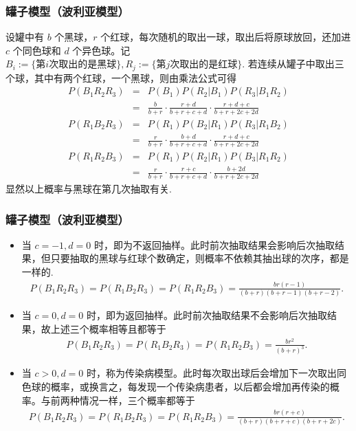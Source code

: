 \begin{frame}
	\frametitle{罐子模型（波利亚模型）}
	\begin{exam}
		设罐中有 $b$ 个黑球，$r$ 个红球，每次随机的取出一球，取出后将原球放回，还加进 $c$ 个同色球和 $d$ 个异色球。记 $B_i:=\{\mbox{第} i\mbox{次取出的是黑球}\}, R_j:=\{\mbox{第} j\mbox{次取出的是红球}\}$. 若连续从罐子中取出三个球，其中有两个红球，一个黑球，则由乘法公式可得
		\begin{eqnarray*}
			P(B_1R_2R_3)&=&P(B_1)P(R_2|B_1)P(R_3|B_1R_2)\\
			&=&\frac{b}{b+r}\cdot\frac{r+d}{b+r+c+d}\cdot\frac{r+d+c}{b+r+2c+2d}\\
			P(R_1B_2R_3)&=&P(R_1)P(B_2|R_1)P(R_3|R_1B_2)\\
			&=&\frac{r}{b+r}\cdot\frac{b+d}{b+r+c+d}\cdot\frac{r+d+c}{b+r+2c+2d}\\
			P(R_1R_2B_3)&=&P(R_1)P(R_2|R_1)P(B_3|R_1R_2)\\
			&=&\frac{r}{b+r}\cdot\frac{r+c}{b+r+c+d}\cdot\frac{b+2d}{b+r+2c+2d}
		\end{eqnarray*}
		显然以上概率与黑球在第几次抽取有关.
	\end{exam}
\end{frame}
\begin{frame}
	\frametitle{罐子模型（波利亚模型）}
	\vspace{-0.3cm}
	\begin{itemize}[<+-|alert@+>]
		\item 当 $c=-1, d=0$ 时，即为不返回抽样。此时前次抽取结果会影响后次抽取结果，但只要抽取的黑球与红球个数确定，则概率不依赖其抽出球的次序，都是一样的.
		{\small\begin{eqnarray*}
				P(B_1R_2R_3)= P(R_1B_2R_3)=P(R_1R_2B_3)=\frac{br(r-1)}{(b+r)(b+r-1)(b+r-2)}.
		\end{eqnarray*}}
		\item 当 $c=0,d=0$ 时，即为返回抽样。此时前次抽取结果不会影响后次抽取结果，故上述三个概率相等且都等于
		{\small\begin{eqnarray*}
				P(B_1R_2R_3)= P(R_1B_2R_3)=P(R_1R_2B_3)=\frac{br^2}{(b+r)^3}.
		\end{eqnarray*}}
		\item 当 $c>0,d=0$ 时，称为传染病模型。此时每次取出球后会增加下一次取出同色球的概率，或换言之，每发现一个传染病患者，以后都会增加再传染的概率。与前两种情况一样，三个概率都等于
		{\small\begin{eqnarray*}
				P(B_1R_2R_3)= P(R_1B_2R_3)=P(R_1R_2B_3)=\frac{br(r+c)}{(b+r)(b+r+c)(b+r+2c)}.                                                        \end{eqnarray*}}

	\end{itemize}
\end{frame}
